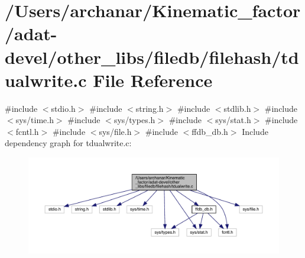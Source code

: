 \hypertarget{adat-devel_2other__libs_2filedb_2filehash_2tdualwrite_8c}{}\section{/\+Users/archanar/\+Kinematic\+\_\+factor/adat-\/devel/other\+\_\+libs/filedb/filehash/tdualwrite.c File Reference}
\label{adat-devel_2other__libs_2filedb_2filehash_2tdualwrite_8c}
{\ttfamily \#include $<$stdio.\+h$>$}\newline
{\ttfamily \#include $<$string.\+h$>$}\newline
{\ttfamily \#include $<$stdlib.\+h$>$}\newline
{\ttfamily \#include $<$sys/time.\+h$>$}\newline
{\ttfamily \#include $<$sys/types.\+h$>$}\newline
{\ttfamily \#include $<$sys/stat.\+h$>$}\newline
{\ttfamily \#include $<$fcntl.\+h$>$}\newline
{\ttfamily \#include $<$sys/file.\+h$>$}\newline
{\ttfamily \#include $<$ffdb\+\_\+db.\+h$>$}\newline
Include dependency graph for tdualwrite.\+c\+:
\nopagebreak
\begin{figure}[H]
\begin{center}
\leavevmode
\includegraphics[width=350pt]{d0/de8/adat-devel_2other__libs_2filedb_2filehash_2tdualwrite_8c__incl}
\end{center}
\end{figure}
